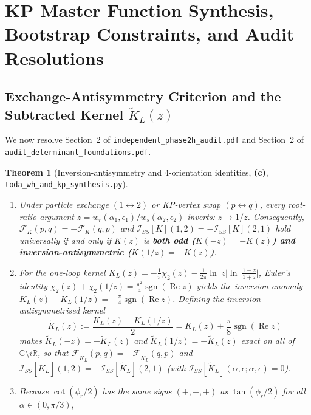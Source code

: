 \documentclass[11pt,a4paper]{article}
\newcommand{\Lc}{\textsf{\textbf{(c)}}}
\newcommand{\scrshort}{\texttt{toda\_\allowbreak wh\_\allowbreak and\_\allowbreak kp\_\allowbreak synthesis.py}}
\newtheorem{theorem}{Theorem}[section]
\theoremstyle{remark}
\begin{document}
\section{KP Master Function Synthesis, Bootstrap Constraints, and Audit Resolutions}

\subsection{Exchange-Antisymmetry Criterion and the Subtracted Kernel $\widetilde{K}_L(z)$}
We now resolve Section~2 of \texttt{independent\_phase2h\_audit.pdf} and Section~2 of
\texttt{audit\_determinant\_foundations.pdf}.

\begin{theorem}[Inversion-antisymmetry and 4-orientation identities, \Lc, \scrshort]\label{thm:inversion_orientation}
\begin{enumerate}
\item Under particle exchange $(1 \leftrightarrow 2)$ or KP-vertex swap $(p \leftrightarrow q)$,
  every root-ratio argument $z = w_r(\alpha_1,\epsilon_1)/w_s(\alpha_2,\epsilon_2)$ inverts: $z \mapsto 1/z$.
  Consequently, $\mathcal{F}_K(p,q) = -\mathcal{F}_K(q,p)$ and
  $\mathcal{I}_{SS}[K](1,2) = -\mathcal{I}_{SS}[K](2,1)$ hold universally if and only if $K(z)$ is
  \textbf{both odd ($K(-z) = -K(z)$) and inversion-antisymmetric ($K(1/z) = -K(z)$)}.
\item For the one-loop kernel $K_L(z) = -\frac{1}{\pi}\chi_2(z) - \frac{1}{2\pi}\ln|z|\ln\big|\frac{1-z}{1+z}\big|$,
  Euler's identity $\chi_2(z) + \chi_2(1/z) = \frac{\pi^2}{4}\operatorname{sgn}(\operatorname{Re} z)$ yields the
  inversion anomaly $K_L(z) + K_L(1/z) = -\frac{\pi}{4}\operatorname{sgn}(\operatorname{Re} z)$.
  Defining the inversion-antisymmetrised kernel
  \begin{equation}\label{eq:ktilde_L}
    \boxed{\widetilde{K}_L(z) := \frac{K_L(z) - K_L(1/z)}{2} = K_L(z) + \frac{\pi}{8}\operatorname{sgn}(\operatorname{Re} z)}
  \end{equation}
  makes $\widetilde{K}_L(-z) = -\widetilde{K}_L(z)$ and $\widetilde{K}_L(1/z) = -\widetilde{K}_L(z)$
  exact on all of $\mathbb{C}\setminus i\mathbb{R}$, so that
  $\mathcal{F}_{\widetilde{K}_L}(p,q) = -\mathcal{F}_{\widetilde{K}_L}(q,p)$ and
  $\mathcal{I}_{SS}[\widetilde{K}_L](1,2) = -\mathcal{I}_{SS}[\widetilde{K}_L](2,1)$
  (with $\mathcal{I}_{SS}[\widetilde{K}_L](\alpha,\epsilon;\alpha,\epsilon) = 0$).
\item Because $\cot(\phi_r/2)$ has the same signs $(+,-,+)$ as $\tan(\phi_r/2)$ for all $\alpha \in (0,\pi/3)$,

\end{enumerate}
\end{theorem}
\end{document}

